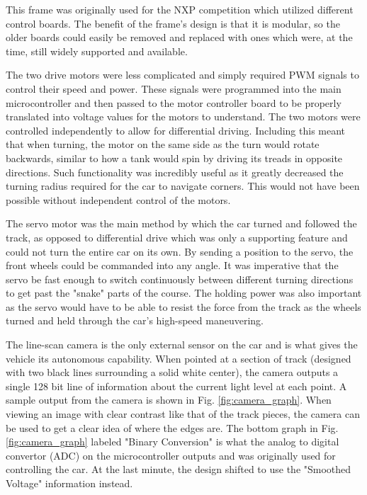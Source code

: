 \documentclass[conference]{IEEEtran}
\begin{document}
    This frame was originally used for the NXP competition which utilized different control boards. The benefit of the frame's
    design is that it is modular, so the older boards could easily be removed
    and replaced with ones which were, at the time, still widely supported and
    available.

    The two drive motors were less complicated and simply required PWM signals
    to control their speed and power. These signals were programmed into the
    main microcontroller and then passed to the motor controller board to be
    properly translated into voltage values for the motors to understand. The
    two motors were controlled independently to allow for differential
    driving. Including this meant that when turning, the motor on the same
    side as the turn would rotate backwards, similar to how a tank would spin
    by driving its treads in opposite directions. Such functionality was
    incredibly useful as it greatly decreased the turning radius required for
    the car to navigate corners. This would not have been possible without
    independent control of the motors.

    The servo motor was the main method by which the car turned and followed
    the track, as opposed to differential drive which was only a supporting
    feature and could not turn the entire car on its own. By sending a
    position to the servo, the front wheels could be commanded into any angle.
    It was imperative that the servo be fast enough to switch continuously
    between different turning directions to get past the "snake" parts of the
    course. The holding power was also important as the servo would have to be
    able to resist the force from the track as the wheels turned and held
    through the car's high-speed maneuvering.

    The line-scan camera is the only external sensor on the car and is what
    gives the vehicle its autonomous capability. When pointed at a section of
    track (designed with two black lines surrounding a solid white center),
    the camera outputs a single 128 bit line of information about the current
    light level at each point. A sample output from the camera is shown in
    Fig. \ref{fig:camera_graph}. When viewing an image with clear contrast
    like that of the track pieces, the camera can be used to get a clear idea
    of where the edges are. The bottom graph in Fig. \ref{fig:camera_graph}
    labeled "Binary Conversion" is what the analog to digital convertor (ADC)
    on the microcontroller outputs and was originally used for controlling the
    car. At the last minute, the design shifted to use the "Smoothed Voltage"
    information instead.
\end{document}
